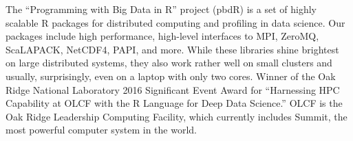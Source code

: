 	The ``Programming with Big Data in R'' project (pbdR) is a set of highly
	scalable R packages for distributed computing and profiling in data
	science. Our packages include high performance, high-level interfaces to
	MPI, ZeroMQ, ScaLAPACK, NetCDF4, PAPI, and more. While these libraries
	shine brightest on large distributed systems, they also work rather well
	on small clusters and usually, surprisingly, even on a laptop with only
	two cores. Winner of the Oak Ridge National Laboratory 2016 Significant
	Event Award for ``Harnessing HPC Capability at OLCF with the R Language
	for Deep Data Science.'' OLCF is the Oak Ridge Leadership Computing
	Facility, which currently includes Summit, the most powerful computer
	system in the world.
